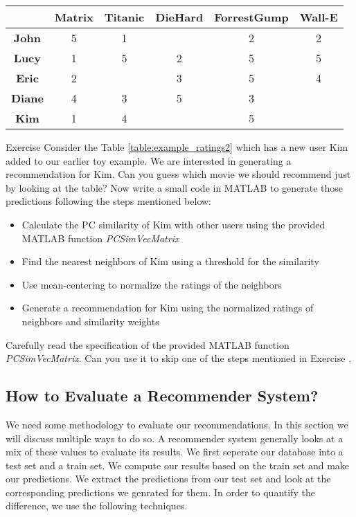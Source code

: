 \begin{table*}
\centering
\begin{tabular}{|c|c|c|c|c|c|}
\hline
\textbf{} 			& \textbf{Matrix} & \textbf{Titanic} & \textbf{DieHard} & \textbf{ForrestGump} & \textbf{Wall-E}\\ 
\hline
\textbf{John} 		& 	 	5		  & 		1		 & 				    &   	2			   & 		2		\\ 
\hline
\textbf{Lucy} 		& 	 	1		  & 		5		 & 		2		    &   	5			   & 		5		\\ 
\hline
\textbf{Eric} 		& 	 	2		  & 				 & 		3		    &   	5			   & 		4		\\ 
\hline
\textbf{Diane} 		& 	 	4		  & 		3		 & 		5		    &   	3			   & 				\\ 
\hline
\textbf{Kim} 		& 	 	1		  & 		4		 & 				    &   	5			   & 				\\ 
\hline
\end{tabular}
\caption{Example ratings}
\label{table:example_ratings2}
\end{table*}

\begin{myremark}{Exercise }
Consider the Table \ref{table:example_ratings2} which has a new user Kim added to our earlier toy example. We are interested in generating a recommendation for Kim. Can you guess which movie we should recommend just by looking at the table? Now write a small code in MATLAB to generate those predictions following the steps mentioned below:
\begin{itemize}
\item{}Calculate the PC similarity of Kim with other users using the provided MATLAB function \textit{PCSimVecMatrix}
\item{}Find the nearest neighbors of Kim using a threshold for the similarity
\item{}Use mean-centering to normalize the ratings of the neighbors 
\item{}Generate a recommendation for Kim using the normalized ratings of neighbors and similarity weights
\end{itemize}
\end{myremark}
Carefully read the specification of the provided MATLAB function \textit{PCSimVecMatrix}. Can you use it to skip one of the steps mentioned in Exercise .
\subsection{How to Evaluate a Recommender System?}
We need some methodology to evaluate our recommendations. In this section we will discuss multiple ways to do so. A recommender system generally looks at a mix of these values to evaluate its results. We first seperate our database into a test set and a train set. We compute our results based on the train set and make our predictions. We extract the predictions from our test set and look at the corresponding predictions we genrated for them. In order to quantify the difference, we use the following techniques.
